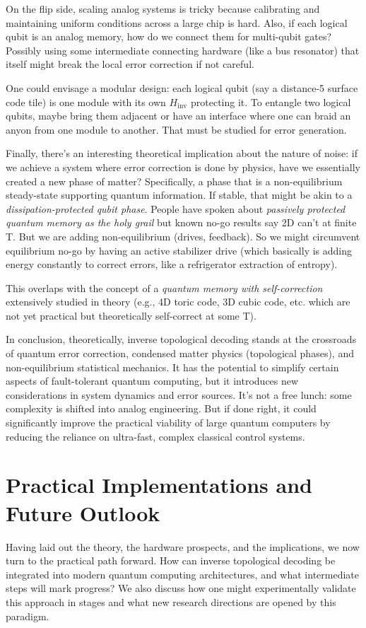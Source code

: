 \documentclass[11pt]{article}
\begin{document}
On the flip side, scaling analog systems is tricky because calibrating and maintaining uniform conditions across a large chip is hard. Also, if each logical qubit is an analog memory, how do we connect them for multi-qubit gates? Possibly using some intermediate connecting hardware (like a bus resonator) that itself might break the local error correction if not careful.

One could envisage a modular design: each logical qubit (say a distance-5 surface code tile) is one module with its own $H_{\mathrm{inv}}$ protecting it. To entangle two logical qubits, maybe bring them adjacent or have an interface where one can braid an anyon from one module to another. That must be studied for error generation.

Finally, there's an interesting theoretical implication about the nature of noise: if we achieve a system where error correction is done by physics, have we essentially created a new phase of matter? Specifically, a phase that is a non-equilibrium steady-state supporting quantum information. If stable, that might be akin to a \textit{dissipation-protected qubit phase}. People have spoken about \textit{passively protected quantum memory as the holy grail} but known no-go results say 2D can't at finite T. But we are adding non-equilibrium (drives, feedback). So we might circumvent equilibrium no-go by having an active stabilizer drive (which basically is adding energy constantly to correct errors, like a refrigerator extraction of entropy).

This overlaps with the concept of a \textit{quantum memory with self-correction} extensively studied in theory (e.g., 4D toric code, 3D cubic code, etc. which are not yet practical but theoretically self-correct at some T).

In conclusion, theoretically, inverse topological decoding stands at the crossroads of quantum error correction, condensed matter physics (topological phases), and non-equilibrium statistical mechanics. It has the potential to simplify certain aspects of fault-tolerant quantum computing, but it introduces new considerations in system dynamics and error sources. It's not a free lunch: some complexity is shifted into analog engineering. But if done right, it could significantly improve the practical viability of large quantum computers by reducing the reliance on ultra-fast, complex classical control systems.

\section{Practical Implementations and Future Outlook}
Having laid out the theory, the hardware prospects, and the implications, we now turn to the practical path forward. How can inverse topological decoding be integrated into modern quantum computing architectures, and what intermediate steps will mark progress? We also discuss how one might experimentally validate this approach in stages and what new research directions are opened by this paradigm.
\end{document}
